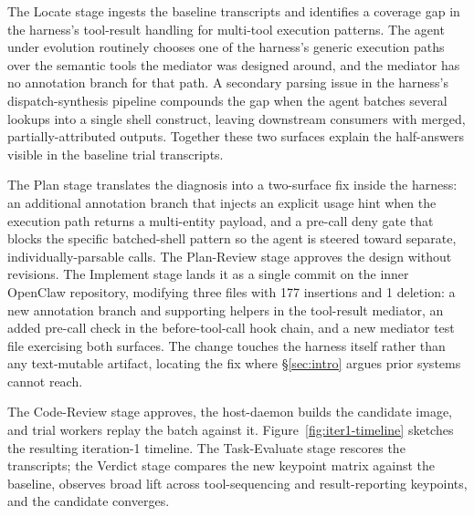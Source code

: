 \documentclass{article}
\begin{document}
The Locate stage ingests the baseline transcripts and identifies a coverage gap in the harness's tool-result handling for multi-tool execution patterns. The agent under evolution routinely chooses one of the harness's generic execution paths over the semantic tools the mediator was designed around, and the mediator has no annotation branch for that path. A secondary parsing issue in the harness's dispatch-synthesis pipeline compounds the gap when the agent batches several lookups into a single shell construct, leaving downstream consumers with merged, partially-attributed outputs. Together these two surfaces explain the half-answers visible in the baseline trial transcripts.

The Plan stage translates the diagnosis into a two-surface fix inside the harness: an additional annotation branch that injects an explicit usage hint when the execution path returns a multi-entity payload, and a pre-call deny gate that blocks the specific batched-shell pattern so the agent is steered toward separate, individually-parsable calls. The Plan-Review stage approves the design without revisions. The Implement stage lands it as a single commit on the inner OpenClaw repository, modifying three files with 177 insertions and 1 deletion: a new annotation branch and supporting helpers in the tool-result mediator, an added pre-call check in the before-tool-call hook chain, and a new mediator test file exercising both surfaces. The change touches the harness itself rather than any text-mutable artifact, locating the fix where \S\ref{sec:intro} argues prior systems cannot reach.

The Code-Review stage approves, the host-daemon builds the candidate image, and trial workers replay the batch against it. Figure~\ref{fig:iter1-timeline} sketches the resulting iteration-1 timeline. The Task-Evaluate stage rescores the transcripts; the Verdict stage compares the new keypoint matrix against the baseline, observes broad lift across tool-sequencing and result-reporting keypoints, and the candidate converges.
\end{document}
